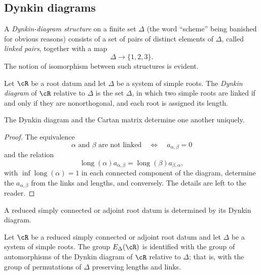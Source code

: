 \subsection{Dynkin diagrams}\label{sga3:XXI:7.4}

\begin{definition}\label{sga3:XXI:7.4.1}
A \emph{Dynkin-diagram structure} on a finite set \(\Delta\)
(the word ``scheme'' being banished for obvious reasons) consists
of a set of pairs of distinct elements of \(\Delta\), called
\emph{linked pairs}, together with a map
\[
 \Delta\longrightarrow\{1,2,3\}.
\]
The notion of isomorphism between such structures is evident.
\end{definition}

\begin{definition}\label{sga3:XXI:7.4.2}
Let \(\cR\) be a root datum and let \(\Delta\) be a system of
simple roots.  The \emph{Dynkin diagram} of \(\cR\) relative to
\(\Delta\) is the set \(\Delta\), in which two simple roots are
linked if and only if they are nonorthogonal, and each root is
assigned its length.
\end{definition}

\begin{proposition}\label{sga3:XXI:7.4.3}
The Dynkin diagram and the Cartan matrix determine one another
uniquely.
\end{proposition}

\begin{proof}
The equivalence
\[
 \alpha\text{ and }\beta\text{ are not linked}
 \quad\Longleftrightarrow\quad
 a_{\alpha,\beta}=0
\]
and the relation
\[
 \operatorname{long}(\alpha)a_{\alpha,\beta}
 =
 \operatorname{long}(\beta)a_{\beta,\alpha},
\]
with \(\inf\operatorname{long}(\alpha)=1\) in each connected
component of the diagram, determine the \(a_{\alpha,\beta}\) from
the links and lengths, and conversely.  The details are left to the
reader.
\end{proof}

\begin{corollary}\label{sga3:XXI:7.4.4}
A reduced simply connected or adjoint root datum is determined by
its Dynkin diagram.
\end{corollary}

\begin{corollary}\label{sga3:XXI:7.4.5}
Let \(\cR\) be a reduced simply connected or adjoint root datum and
let \(\Delta\) be a system of simple roots.  The group
\(E_\Delta(\cR)\) is identified with the group of automorphisms of
the Dynkin diagram of \(\cR\) relative to \(\Delta\); that is, with
the group of permutations of \(\Delta\) preserving lengths and
links.
\end{corollary}

